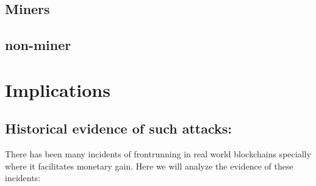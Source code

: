 \subsection{Miners}
% 



\subsection{non-miner}
% 





\section{Implications} %

\subsection{Historical evidence of such attacks:}\par\noindent
There has been many incidents of frontrunning in real world blockchains specially where it facilitates monetary gain. Here we will analyze the evidence of these incidents:





